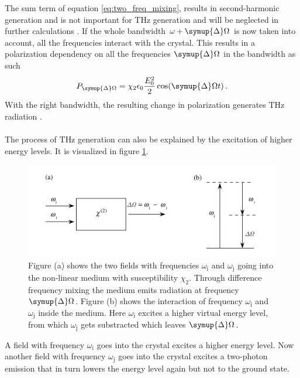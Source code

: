 The sum term of equation \eqref{eq:two_freq_mixing}, results in second-harmonic generation \cite{boyd2020nonlinear} and is not important for $\si{\tera\hertz}$ generation and will be neglected in further calculations \cite{wiki_book}.
If the whole bandwidth $\omega + \symup{\Delta}\Omega$ is now taken into account, all the frequencies interact with the crystal.
This results in a polarization dependency on all the frequencies $\symup{\Delta}\Omega$ in the bandwidth as such
\begin{equation}
    P_{\symup{\Delta}\Omega} = \chi_2 \epsilon_0 \frac{E_0^2}{2}\cos(\symup{\Delta}\Omega t) \, .
    \label{eq:polarization_depens}
\end{equation}
With the right bandwidth, the resulting change in polarization generates $\si{\tera\hertz}$ radiation \cite{book_optical_rectification,wiki_book}.
\\\\
The process of $\si{\tera\hertz}$ generation can also be explained by the excitation of higher energy levels.
It is visualized in figure \ref{fig:freq_mix}.\FloatBarrier
\begin{figure}
    \centering
    \includegraphics[width=\textwidth]{refferenced_pic/diffrence_frequency_mixing.PNG}
    \caption{Figure (a) shows the two fields with frequencies $\omega_\text{i} $ and $\omega_\text{j}$ going into the non-linear medium with susceptibility $\chi_2$.
    Through difference frequency mixing the medium emits radiation at frequency $\symup{\Delta}\Omega$.
    Figure (b) shows the interaction of frequency $\omega_\text{i} $ and $\omega_\text{j}$ inside the medium.
    Here $\omega_\text{i}$ excites a higher virtual energy level, from which $\omega_\text{j}$ gets substracted which leaves $\symup{\Delta}\Omega$.}
    \label{fig:freq_mix}
\end{figure}\FloatBarrier
A field with frequency $\omega_\text{i}$ goes into the crystal excites a higher energy level.
Now another field  with frequency $\omega_\text{j}$ goes into the crystal excites a two-photon emission that in turn lowers the energy level again but not to the ground state.

